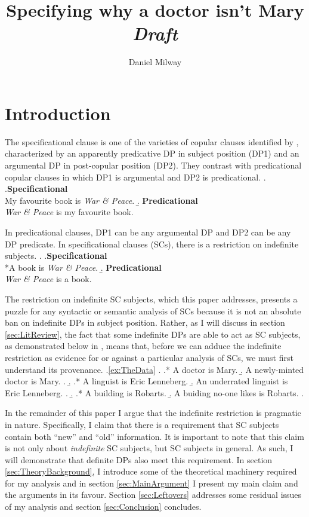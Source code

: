 \documentclass[letterpaper]{article}
\title{Specifying why a doctor isn't Mary\\\textit{Draft}}
\author{Daniel Milway}
\begin{document}
\maketitle
\doublespacing
\section{Introduction}
The specificational clause is one of the varieties of copular clauses identified by \textcite{higgins1973pseudo}, characterized by an apparently predicative DP in subject position (DP1) and an argumental DP in post-copular position (DP2).
They contrast with predicational copular clauses in which DP1 is argumental and DP2 is predicational.
\ex.
\a.\textbf{Specificational}\\
My favourite book is \textit{War \& Peace}.
\b. \textbf{Predicational}\\
\textit{War \& Peace} is my favourite book.

In predicational clauses, DP1 can be any argumental DP and DP2 can be any DP predicate.
In specificational clauses (SCs), there is a restriction on indefinite subjects.
\ex.\label{ex:TheData}
\a.\textbf{Specificational}\\
*A book is \textit{War \& Peace}.
\b. \textbf{Predicational}\\
\textit{War \& Peace} is a book.

The restriction on indefinite SC subjects, which this paper addresses, presents a puzzle for any syntactic or semantic analysis of SCs because it is not an absolute ban on indefinite DPs in subject position.
Rather, as I will discuss in section \ref{sec:LitReview}, the fact that some indefinite DPs are able to act as SC subjects, as demonstrated below in \Next, means that, before we can adduce the indefinite restriction as evidence for or against a particular analysis of SCs, we must first understand its provenance.
\ex.\ref{ex:TheData} 
\a.
\a.* A doctor is Mary.
\b. A newly-minted doctor is Mary.
\z.
\b.
\a.* A linguist is Eric Lenneberg.
\b. An underrated linguist is Eric Lenneberg.
\z.
\b.
\a.* A building is Robarts.
\b. A buiding no-one likes is Robarts.
\z.

In the remainder of this paper I argue that the indefinite restriction is pragmatic in nature.
Specifically, I claim that there is a requirement that SC subjects contain both ``new'' and ``old'' information.
It is important to note that this claim is not only about \textit{indefinite} SC subjects, but SC subjects in general.
As such, I will demonstrate that definite DPs also meet this requirement.
In section \ref{sec:TheoryBackground}, I introduce some of the theoretical machinery required for my analysis and in section \ref{sec:MainArgument} I present my main claim and the arguments in its favour.
Section \ref{sec:Leftovers} addresses some residual issues of my analysis and section \ref{sec:Conclusion} concludes.
\end{document}
